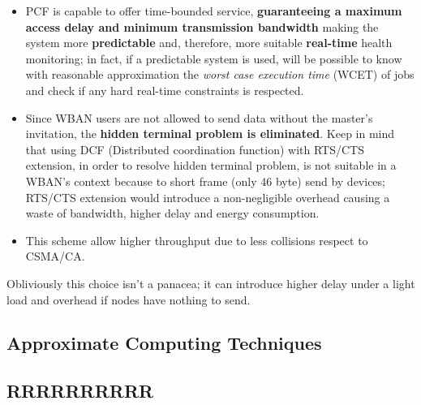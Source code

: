 \documentclass[sigchi]{acmart}
\begin{document}
\begin{itemize}

\item PCF is capable to offer time-bounded service, \textbf{guaranteeing a maximum access delay and minimum transmission bandwidth} making the system more \textbf{predictable} and, therefore, more suitable \textbf{real-time} health monitoring; in fact, if a predictable system is used, will be possible to know with reasonable approximation the \textit{worst case execution time} (WCET) of jobs and check if any hard real-time constraints is respected.

\item Since WBAN users are not allowed to send data without the master's invitation, the \textbf{hidden terminal problem is eliminated}. Keep in mind that using DCF (Distributed coordination function) with RTS/CTS extension, in order to resolve hidden terminal problem, is not suitable in a WBAN's context because to short frame (only 46 byte) send by devices; RTS/CTS extension would introduce a non-negligible overhead causing a waste of bandwidth, higher delay and energy consumption.

\item This scheme allow higher throughput due to less collisions respect to CSMA/CA.

\end{itemize}

Obliviously this choice isn't a panacea; it can introduce higher delay under a light load and overhead if nodes have nothing to send.














\subsection{Approximate Computing Techniques}




\subsection{RRRRRRRRRR}
\end{document}

